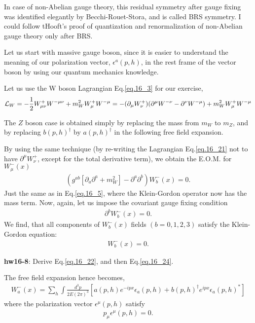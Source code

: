 \documentclass[12pt]{article}
\def\del{{\partial}}
\def\dgr{\dagger}
\begin{document}
In case of non-Abelian gauge theory, this residual symmetry after
gauge fixing was identified elegantly by Becchi-Rouet-Stora, and
is called BRS symmetry.  I could follow tHooft's proof of quantization
and renormalization of non-Abelian gauge theory only after BRS.

Let us start with massive gauge boson, since it is easier to
understand the meaning of our polarization vector, $\epsilon^a(p,h)$,
in the rest frame of the vector boson by using our quantum mechanics
knowledge.

Let us use the W boson Lagrangian Eq.\ref{eq.16_3} for our exercise,
\begin{eqnarray}
  {\cal L}_{W}
= -\frac{1}{2} W^+_{\mu\nu} W^{- \mu\nu} + m_W^2 W^+_\mu W^{- \mu}
= - (\del_\mu W^+_\nu) (\del^\mu W^{-\nu} -\del^\nu W^{-\mu})
  + m_W^2 W^+_\mu W^{-\mu} \label{eq.16_21}
\end{eqnarray}

The $Z$ boson case is obtained simply by replacing the mass from $m_W$
to $m_Z$, and by replacing $b(p,h)^\dgr$ by $a(p,h)^\dgr$ in the following
free field expansion.

By using the same technique (by re-writing the Lagrangian Eq.\ref{eq.16_21} not
to have $\del^\mu W^+_\nu$, except for the total derivative term), we
obtain the E.O.M. for $W^-_\mu(x)$
\begin{eqnarray}
  (g^{ab} [\del_a \del^a+m_W^2] -\del^a \del^b) W^-_b(x) = 0. \label{eq.16_22}
\end{eqnarray}
Just the same as in Eq.\ref{eq.16_5}, where the Klein-Gordon operator now has the mass term. Now, again, let us impose the covariant gauge fixing
condition
\begin{eqnarray}
  \del^b W^-_b(x) = 0. \label{eq.16_23}
\end{eqnarray}
We find, that all components of $W^-_b(x)$ fields $(b=0,1,2,3)$ satisfy
the Klein-Gordon equation:
\begin{eqnarray}
  [ \del_a \del^a + m_W^2 ] W^-_b(x) = 0. \label{eq.16_24}
\end{eqnarray}

{\bf hw16-8}: Derive  Eq.\ref{eq.16_22}, and then Eq.\ref{eq.16_24}.

The free field expansion hence becomes,
\begin{eqnarray}
  W^-_a(x)
= \sum_h \int \frac{d^3p}{2E(2\pi)^3}
[ a(p,h) e^{-ipx} \epsilon_a(p,h) + b(p,h)^\dgr e^{ipx} \epsilon_a(p,h)^* ] \label{eq.16_25}
\end{eqnarray}
where the polarization vector $\epsilon^\mu(p,h)$ satisfy
\begin{eqnarray}
  p_\mu \epsilon^\mu(p,h) = 0. \label{eq.16_26}
\end{eqnarray}
\end{document}
